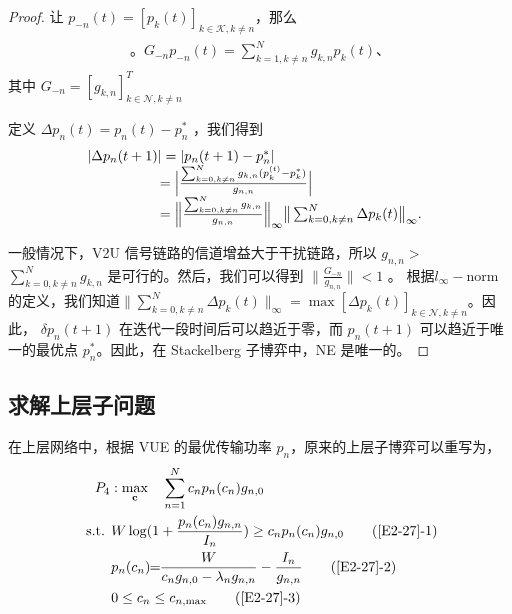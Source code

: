 \begin{proof}
让 $p_{-n}(t)=[p_k(t)]_{k\in\mathcal{K},k\neq n}$，那么
\begin{eqnarray}\label{25}
\begin{array}{lll}。
G_{-n}p_{-n}(t)=\sum\limits_{k=1,k\neq n}^N g_{k,n}p_k(t)、
\end{array}
\end{eqnarray}
其中 $G_{-n}=[g_{k,n}]_{k\in\mathcal{N},k\neq n}^T$ \par
定义 $\Delta p_{n}(t)=p_{n}(t)-p_{n}^*$ ，我们得到
\begin{eqnarray}\label{26}
\hspace{-0.2cm}
 \begin{array}{lll}
&\!\!\!\!\!\!\!|\Delta p_{n}(t+1)|=|p_{n}(t+1)-p_{n}^*|\\
&\quad \quad \quad \quad =\Big|\frac{\sum_{k=0,k\neq n}^N g_{k,n}(p_k^{(t)}-p_k^*)}{g_{n,n}}\Big|\\
&\quad \quad \quad \quad =\Big\|\frac{\sum_{k=0,k\neq n}^Ng_{k,n}}{g_{n,n}}\Big\|_\infty \big\|\sum_{k=0,k\neq n}^N\Delta p_{k}(t)\big\|_\infty.
\end{array}
\end{eqnarray}

一般情况下，V2U 信号链路的信道增益大于干扰链路，所以 $g_{n,n}$$>$$\sum_{k=0,k\neq n}^N g_{k,n}$ 是可行的。然后，我们可以得到 $\|\frac{G_{-n}}{g_{n,n}}\|$$<$$1$ 。
根据$l_\infty-$norm的定义，我们知道$\big\|\sum_{k=0,k\neq n}^N\Delta p_{k}(t)\big\|_\infty$$=$$\max [\Delta p_{k}(t)]_{k\in\mathcal{N},k\neq n}$。因此，
$\delta p_{n}(t+1)$ 在迭代一段时间后可以趋近于零，而 $p_{n}(t+1)$ 可以趋近于唯一的最优点 $p_{n}^*$。因此，在 Stackelberg 子博弈中，NE 是唯一的。
\end{proof}
\subsection{求解上层子问题}\label{section2-3-3}
在上层网络中，根据 VUE 的最优传输功率 $p_n$，原来的上层子博弈可以重写为，
\begin{align}
& \!\!\!\!\!\!\!P_4:\max\limits_{\mathbf{c}} \quad \sum\limits_{n=1}^N c_{n} p_n(c_{n}) g_{n,0}                   \label{E2-27}  \\
\text { s.t. }
& W\log(1+\frac{p_{n}(c_{n}) g_{n,n}}{I_n}) \geq c_{n} p_n(c_{n}) g_{n,0}         \tag{\ref{E2-27}{-1}} \label{E2-27-1}\\  %
& p_n(c_{n})\!\!=\!\!\frac{W}{c_n g_{n,0}-\lambda_n g_{n,n}}-\frac{I_n}{g_{n,n}}  \tag{\ref{E2-27}{-2}} \label{E2-27-2}\\ %
& 0\leq c_n\leq c_{n,\textrm{max}}                                                \tag{\ref{E2-27}{-3}} \label{E2-27-3}
\end{align}

